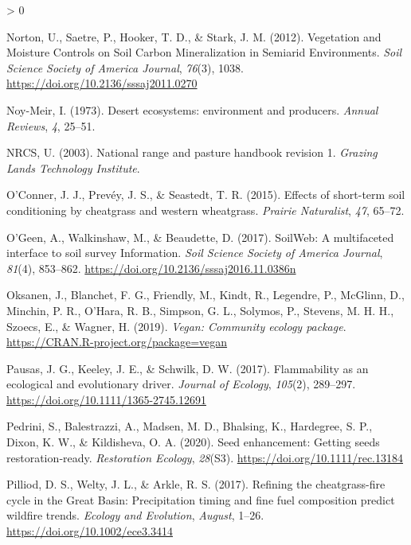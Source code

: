 \documentclass[
  11pt,
  a4paper,
]{article}
\newlength{\cslhangindent}
\newenvironment{CSLReferences}[2] %
 {%
  \setlength{\parindent}{0pt}
  \ifodd #1 \everypar{\setlength{\hangindent}{\cslhangindent}}\ignorespaces\fi
  \ifnum #2 > 0
  \setlength{\parskip}{#2\baselineskip}
  \fi
 }%
 {}
\begin{document}
\begin{CSLReferences}{1}{0}
\leavevmode\hypertarget{ref-Norton2012}{}%
Norton, U., Saetre, P., Hooker, T. D., \& Stark, J. M. (2012). {Vegetation and Moisture Controls on Soil Carbon Mineralization in Semiarid Environments}. \emph{Soil Science Society of America Journal}, \emph{76}(3), 1038. \url{https://doi.org/10.2136/sssaj2011.0270}

\leavevmode\hypertarget{ref-Noy-Meir1973}{}%
Noy-Meir, I. (1973). {Desert ecosystems: environment and producers}. \emph{Annual Reviews}, \emph{4}, 25--51.

\leavevmode\hypertarget{ref-NRCS2003}{}%
NRCS, U. (2003). National {range} and {pasture} {handbook} {revision} 1. \emph{Grazing Lands Technology Institute}.

\leavevmode\hypertarget{ref-OConner2015}{}%
O'Conner, J. J., Prevéy, J. S., \& Seastedt, T. R. (2015). {Effects of short-term soil conditioning by cheatgrass and western wheatgrass}. \emph{Prairie Naturalist}, \emph{47}, 65--72.

\leavevmode\hypertarget{ref-OGeen2017}{}%
O'Geen, A., Walkinshaw, M., \& Beaudette, D. (2017). {SoilWeb: A multifaceted interface to soil survey Information}. \emph{Soil Science Society of America Journal}, \emph{81}(4), 853--862. \url{https://doi.org/10.2136/sssaj2016.11.0386n}

\leavevmode\hypertarget{ref-Oksanen2019}{}%
Oksanen, J., Blanchet, F. G., Friendly, M., Kindt, R., Legendre, P., McGlinn, D., Minchin, P. R., O'Hara, R. B., Simpson, G. L., Solymos, P., Stevens, M. H. H., Szoecs, E., \& Wagner, H. (2019). \emph{Vegan: Community ecology package}. \url{https://CRAN.R-project.org/package=vegan}

\leavevmode\hypertarget{ref-Pausas2017}{}%
Pausas, J. G., Keeley, J. E., \& Schwilk, D. W. (2017). {Flammability as an ecological and evolutionary driver}. \emph{Journal of Ecology}, \emph{105}(2), 289--297. \url{https://doi.org/10.1111/1365-2745.12691}

\leavevmode\hypertarget{ref-Pedrini2020}{}%
Pedrini, S., Balestrazzi, A., Madsen, M. D., Bhalsing, K., Hardegree, S. P., Dixon, K. W., \& Kildisheva, O. A. (2020). Seed enhancement: Getting seeds restoration‐ready. \emph{Restoration Ecology}, \emph{28}(S3). \url{https://doi.org/10.1111/rec.13184}

\leavevmode\hypertarget{ref-Pilliod2017}{}%
Pilliod, D. S., Welty, J. L., \& Arkle, R. S. (2017). {Refining the cheatgrass-fire cycle in the Great Basin: Precipitation timing and fine fuel composition predict wildfire trends}. \emph{Ecology and Evolution}, \emph{August}, 1--26. \url{https://doi.org/10.1002/ece3.3414}


\end{CSLReferences}
\end{document}
